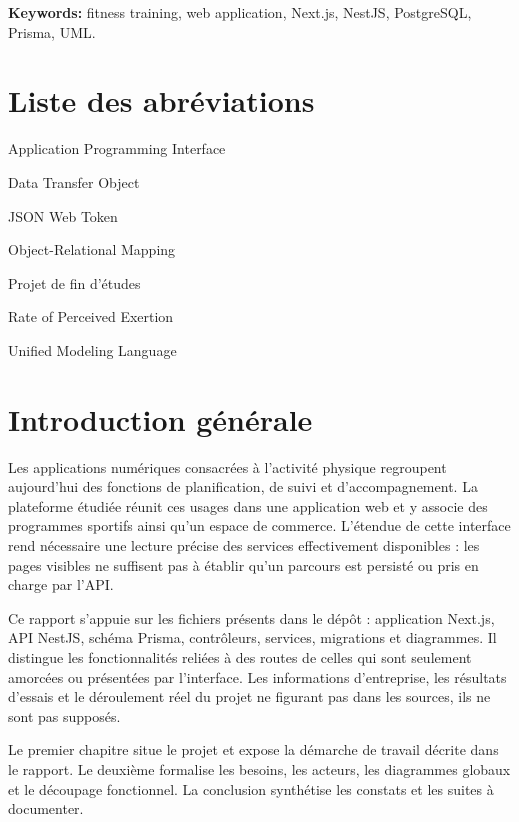 ﻿\documentclass[12pt,a4paper]{report}
\begin{document}
\noindent\textbf{Keywords:} fitness training, web application, Next.js, NestJS, PostgreSQL, Prisma, UML.
\clearpage
\tableofcontents
\clearpage
\listoffigures
{}
\clearpage
\listoftables
{}
\clearpage
\chapter*{Liste des abréviations}
\begin{description}[leftmargin=2.8cm,style=nextline]
  \item[API] Application Programming Interface
  \item[DTO] Data Transfer Object
  \item[JWT] JSON Web Token
  \item[ORM] Object-Relational Mapping
  \item[PFE] Projet de fin d'études
  \item[RPE] Rate of Perceived Exertion
  \item[UML] Unified Modeling Language
\end{description}
\clearpage
{}

\chapter*{Introduction générale}
Les applications numériques consacrées à l'activité physique regroupent aujourd'hui des fonctions de planification, de suivi et d'accompagnement. La plateforme étudiée réunit ces usages dans une application web et y associe des programmes sportifs ainsi qu'un espace de commerce. L'étendue de cette interface rend nécessaire une lecture précise des services effectivement disponibles : les pages visibles ne suffisent pas à établir qu'un parcours est persisté ou pris en charge par l'API.

Ce rapport s'appuie sur les fichiers présents dans le dépôt : application Next.js, API NestJS, schéma Prisma, contrôleurs, services, migrations et diagrammes. Il distingue les fonctionnalités reliées à des routes de celles qui sont seulement amorcées ou présentées par l'interface. Les informations d'entreprise, les résultats d'essais et le déroulement réel du projet ne figurant pas dans les sources, ils ne sont pas supposés.

Le premier chapitre situe le projet et expose la démarche de travail décrite dans le rapport. Le deuxième formalise les besoins, les acteurs, les diagrammes globaux et le découpage fonctionnel. La conclusion synthétise les constats et les suites à documenter.
\end{document}

